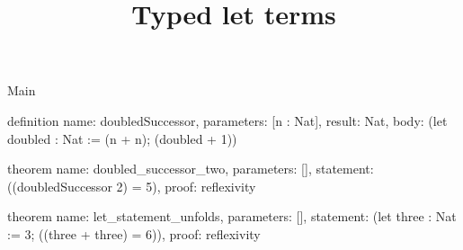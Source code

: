 \begin{lexlean}{Main}
\title{Typed let terms}
\begin{semanticmodule}
definition{
  name: doubledSuccessor,
  parameters: [n : Nat],
  result: Nat,
  body: (let doubled : Nat := (n + n); (doubled + 1))
}

theorem{
  name: doubled_successor_two,
  parameters: [],
  statement: ((doubledSuccessor 2) = 5),
  proof: reflexivity{}
}

theorem{
  name: let_statement_unfolds,
  parameters: [],
  statement: (let three : Nat := 3; ((three + three) = 6)),
  proof: reflexivity{}
}
\end{semanticmodule}
\end{lexlean}
